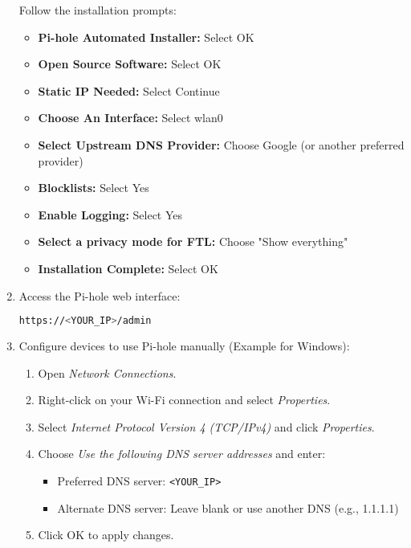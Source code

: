 \begin{enumerate}
    Follow the installation prompts:
    \begin{itemize}
        \item \textbf{Pi-hole Automated Installer:} Select OK
        \item \textbf{Open Source Software:} Select OK
        \item \textbf{Static IP Needed:} Select Continue
        \item \textbf{Choose An Interface:} Select wlan0
        \item \textbf{Select Upstream DNS Provider:} Choose Google (or another preferred provider)
        \item \textbf{Blocklists:} Select Yes
        \item \textbf{Enable Logging:} Select Yes
        \item \textbf{Select a privacy mode for FTL:} Choose "Show everything"
        \item \textbf{Installation Complete:} Select OK
    \end{itemize}

    \item Access the Pi-hole web interface:
    \begin{lstlisting}[language=bash, breaklines=true, breakatwhitespace=true, columns=fullflexible]
    https://<YOUR_IP>/admin
    \end{lstlisting}

    \item Configure devices to use Pi-hole manually (Example for Windows):
    \begin{enumerate}
        \item Open \textit{Network Connections}.
        \item Right-click on your Wi-Fi connection and select \textit{Properties}.
        \item Select \textit{Internet Protocol Version 4 (TCP/IPv4)} and click \textit{Properties}.
        \item Choose \textit{Use the following DNS server addresses} and enter:
        \begin{itemize}
            \item Preferred DNS server: \texttt{\textless YOUR\_IP\textgreater}
            \item Alternate DNS server: Leave blank or use another DNS (e.g., 1.1.1.1)
        \end{itemize}
        \item Click OK to apply changes.
    \end{enumerate}


\end{enumerate}
